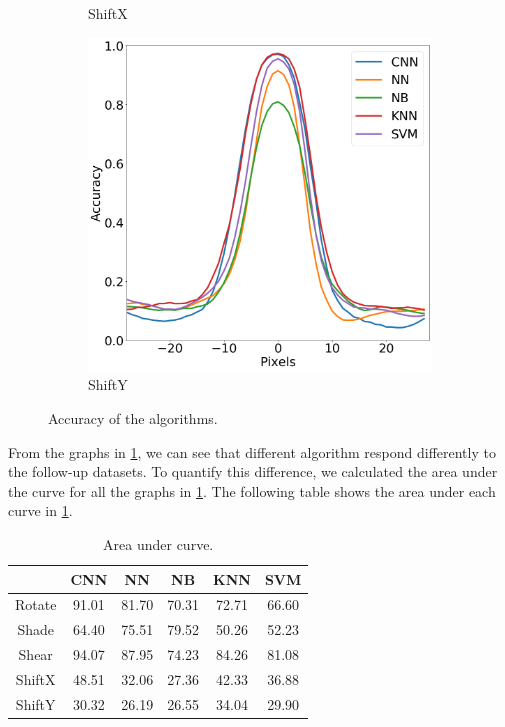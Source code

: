\begin{figure}[htb!]
\begin{subfigure}[b]{0.3\textwidth}
        \caption{ShiftX}
    \end{subfigure}
    \begin{subfigure}[b]{0.3\textwidth}
        \centering
         \includegraphics[width=\textwidth]{chapters/results/MT/ShiftY.png}
        \caption{ShiftY}
    \end{subfigure}
    \caption{Accuracy of the algorithms.}
    \label{fig:Accuracy}
    \end{figure}

 From the graphs in \ref{fig:Accuracy}, we can see that different algorithm respond differently to the follow-up datasets. To quantify this difference, we calculated the area under the curve for all the graphs in \ref{fig:Accuracy}. The following table shows the area under each curve in \ref{fig:Accuracy}.\\
    \begin{table}[H]
    \centering
        \begin{tabular}{|c|c|c|c|c|c|}
        \hline
         & CNN & NN & NB & KNN & SVM \\
         \hline
        Rotate & 91.01 & 81.70 & 70.31 & 72.71 & 66.60  \\
        \hline
        Shade & 64.40 & 75.51 & 79.52 & 50.26 & 52.23 \\
        \hline
        Shear & 94.07 & 87.95 & 74.23 & 84.26 & 81.08 \\
        \hline
        ShiftX & 48.51 & 32.06 & 27.36 & 42.33 & 36.88 \\
        \hline
        ShiftY & 30.32 & 26.19 & 26.55 & 34.04 & 29.90 \\
        \hline
        \end{tabular}
        \caption{Area under curve.}
        \label{tbl:rot-file-format}
    \end{table}
    
